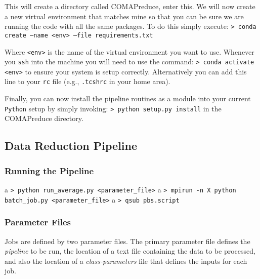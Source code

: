 \documentclass[11pt]{article}
\begin{document}
This will create a directory called COMAPreduce, enter this. We will now create a new virtual environment that matches mine so that you can be sure we are running the code with all the same packages. To do this simply execute:
\newline\noindent
\texttt{> conda create --name <env> --file requirements.txt}
\newline\noindent

Where \texttt{<env>} is the name of the virtual environment you want to use. Whenever you \texttt{ssh} into the machine you will need to use the command:
\newline\noindent
\texttt{> conda activate <env>}
\newline\noindent
to ensure your system is setup correctly. Alternatively you can add this line to your \texttt{rc} file (e.g., \texttt{.tcshrc} in your home area).

Finally, you can now install the pipeline routines as a module into your current \texttt{Python} setup by simply invoking:
\newline\noindent
\texttt{> python setup.py install}
\newline\noindent
in the COMAPreduce directory. 

\subsection{Data Reduction Pipeline}

\subsubsection{Running the Pipeline}
a
\newline\noindent
\texttt{> python run\_average.py <parameter\_file>}
\newline\noindent
a
\newline\noindent
\texttt{> mpirun -n X python batch\_job.py <parameter\_file>}
\newline\noindent
a
\newline\noindent
\texttt{> qsub pbs.script}
\newline\noindent

\subsubsection{Parameter Files}

Jobs are defined by two parameter files. The primary parameter file defines the \textit{pipeline} to be run, the location of a text file containing the data to be processed, and also the location of a \textit{class-parameters} file that defines the inputs for each job.
\end{document}
